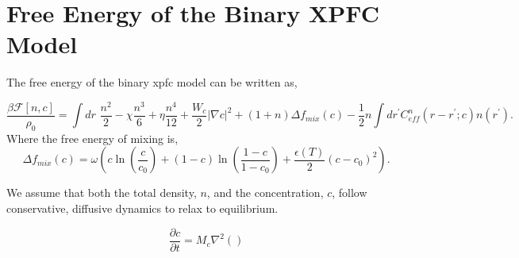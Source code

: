 \documentclass[11pt]{article}
\begin{document}
\section*{Free Energy of the Binary XPFC Model}

The free energy of the binary xpfc model can be written as, 

\begin{equation}
\frac{\beta \mathcal{F}[n, c]}{\rho_0} = \int dr \,\, \frac{n^2}{2} - \chi\frac{n^3}{6}
 + \eta \frac{n^4}{12} + \frac{W_c}{2}\lvert\nabla c\rvert^2 + (1+n)\Delta f_{mix}(c) - \frac{1}{2}n\int dr^\prime C_{eff}^n(r-r^\prime; c)n(r^\prime).
\end{equation}
Where the free energy of mixing is, 
\begin{equation}
\Delta f_{mix}(c) = \omega\left(c\ln\left(\frac{c}{c_0}\right)+(1-c)\ln\left(\frac{1-c}{1-c_0}\right) + \frac{\epsilon(T)}{2} (c-c_0)^2\right).
\end{equation}

We assume that both the total density, $n$, and the concentration, $c$, follow conservative, diffusive dynamics to relax to equilibrium. 

\begin{equation}
\frac{\partial c}{\partial t} = M_c\nabla^2\left(\right)
\end{equation}
\end{document}
